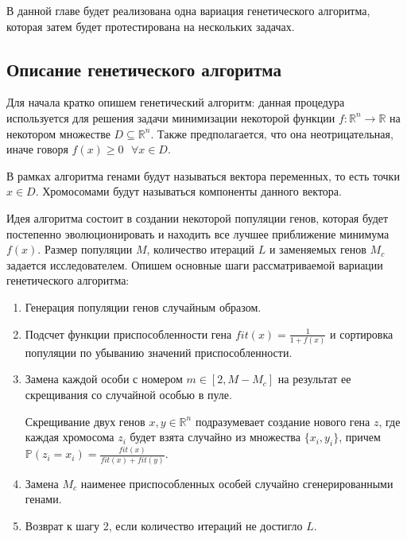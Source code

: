 \documentclass[../main.tex]{subfiles}
\begin{document}
	
	В данной главе будет реализована одна вариация генетического алгоритма, которая затем будет протестирована на нескольких задачах. 
	
	\subsection{Описание генетического алгоритма}
	
	Для начала кратко опишем генетический алгоритм: данная процедура используется для решения задачи минимизации некоторой функции $f: \mathbb{R}^n \rightarrow \mathbb{R}$ на некотором множестве $D \subseteq \mathbb{R}^n$. Также предполагается, что она неотрицательная, иначе говоря $f(x) \geqslant 0 \text{ }\forall x \in D$. 
	
	В рамках алгоритма генами будут называться вектора переменных, то есть точки $x \in D$. Хромосомами будут называться компоненты данного вектора. 
	
	Идея алгоритма состоит в создании некоторой популяции генов, которая будет постепенно эволюционировать и находить все лучшее приближение минимума $f(x)$. Размер популяции $M$, количество итераций $L$ и заменяемых генов $M_c$ задается исследователем.  Опишем основные шаги рассматриваемой вариации генетического алгоритма:
	
	\begin{enumerate}
		\item Генерация популяции генов случайным образом.
		\item Подсчет функции приспособленности гена $fit(x) = \frac{1}{1 + f(x)}$ и сортировка популяции по убыванию значений приспособленности.
		\item Замена каждой особи с номером $m \in [2, M - M_c]$ на результат ее скрещивания со случайной особью в пуле. 
		
		Скрещивание двух генов $x, y \in \mathbb{R}^n$ подразумевает создание нового гена $z$, где каждая хромосома $z_i$ будет взята случайно из множества $\{x_i, y_i\}$, причем $\mathbb{P}(z_i = x_i) = \frac{fit(x)}{fit(x) + fit(y)}$.
		
		\item Замена $M_c$ наименее приспособленных особей случайно сгенерированными генами.
		\item Возврат к шагу 2, если количество итераций не достигло $L$.
		
	\end{enumerate}
\end{document}
